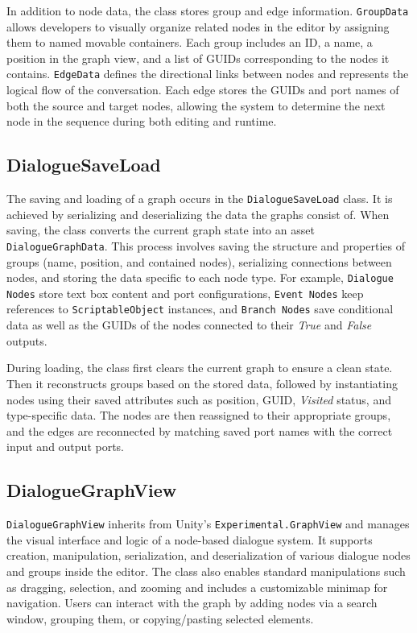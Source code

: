 In addition to node data, the class stores group and edge information. \verb|GroupData| allows developers to visually organize related nodes in the editor by assigning them to named movable containers. Each group includes an ID, a name, a position in the graph view, and a list of GUIDs corresponding to the nodes it contains. \verb|EdgeData| defines the directional links between nodes and represents the logical flow of the conversation. Each edge stores the GUIDs and port names of both the source and target nodes, allowing the system to determine the next node in the sequence during both editing and runtime.


\subsection{DialogueSaveLoad}
\label{devlog:DialogueSaveLoad}
The saving and loading of a graph occurs in the \verb|DialogueSaveLoad| class. It is achieved by serializing and deserializing the data the graphs consist of. When saving, the class converts the current graph state into an asset \verb|DialogueGraphData|. This process involves saving the structure and properties of groups (name, position, and contained nodes), serializing connections between nodes, and storing the data specific to each node type. For example, \verb|Dialogue Nodes| store text box content and port configurations, \verb|Event Nodes| keep references to \verb|ScriptableObject| instances, and \verb|Branch Nodes| save conditional data as well as the GUIDs of the nodes connected to their \textit{True} and \textit{False} outputs.

During loading, the class first clears the current graph to ensure a clean state. Then it reconstructs groups based on the stored data, followed by instantiating nodes using their saved attributes such as position, GUID, \textit{Visited} status, and type-specific data. The nodes are then reassigned to their appropriate groups, and the edges are reconnected by matching saved port names with the correct input and output ports.


\subsection{DialogueGraphView}
\label{devlog:DialogueGraphView}
\verb|DialogueGraphView| inherits from Unity's \verb|Experimental.GraphView| and manages the visual interface and logic of a node-based dialogue system. It supports creation, manipulation, serialization, and deserialization of various dialogue nodes and groups inside the editor. The class also enables standard manipulations such as dragging, selection, and zooming and includes a customizable minimap for navigation. Users can interact with the graph by adding nodes via a search window, grouping them, or copying/pasting selected elements. 

